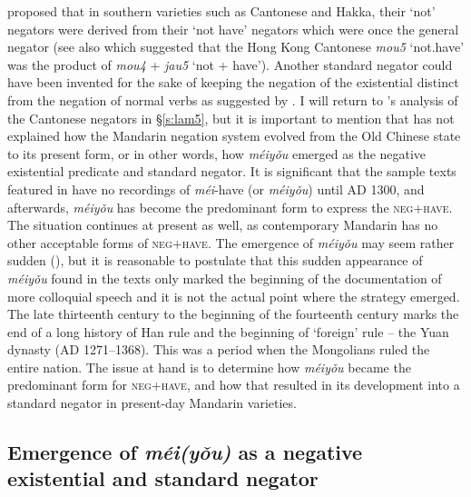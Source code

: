 \documentclass[output=paper]{langscibook}
\begin{document}
\citeauthor{Zhang2002} proposed that in southern varieties such as Cantonese and Hakka, their `not' negators were derived from their `not have' negators which were once the general negator (see also \citealt{Law2014} which suggested that the Hong Kong Cantonese \textit{mou5} `not.have' was the product of \textit{mou4} + \textit{jau5} `not + have'). Another standard negator could have been invented for the sake of keeping the negation of the existential distinct from the negation of normal verbs as suggested by \citet{Veselinova2016}. I will return to \citeauthor{Zhang2002}'s analysis of the Cantonese negators in §\ref{s:lam5}, but it is important to mention that \citeauthor{Zhang2002} has not explained how the Mandarin negation system evolved from the Old Chinese state to its present form, or in other words, how \textit{méiyǒu} emerged as the negative existential predicate and standard negator. It is significant that the sample texts featured in  have no recordings of \textit{méi}-have (or \textit{méiyǒu}) until AD 1300, and afterwards, \textit{méiyǒu} has become the predominant form to express the \textsc{neg}+\textsc{have}. The situation continues at present as well, as contemporary Mandarin has no other acceptable forms of \textsc{neg}+\textsc{have}. The emergence of \textit{méiyǒu} may seem rather sudden (), but it is reasonable to postulate that this sudden appearance of \textit{méiyǒu} found in the texts only marked the beginning of the documentation of more colloquial speech and it is not the actual point where the strategy emerged. The late thirteenth century to the beginning of the fourteenth century marks the end of a long history of Han rule and the beginning of `foreign' rule – the Yuan dynasty (AD 1271–1368). This was a period when the Mongolians ruled the entire nation. The issue at hand is to determine how \textit{méiyǒu} became the predominant form for \textsc{neg}+\textsc{have}, and how that resulted in its development into a standard negator in present-day Mandarin varieties.



\subsection{Emergence of \textit{méi(yǒu)} as a negative existential and standard negator}\label{s:lam4-2}
\end{document}
